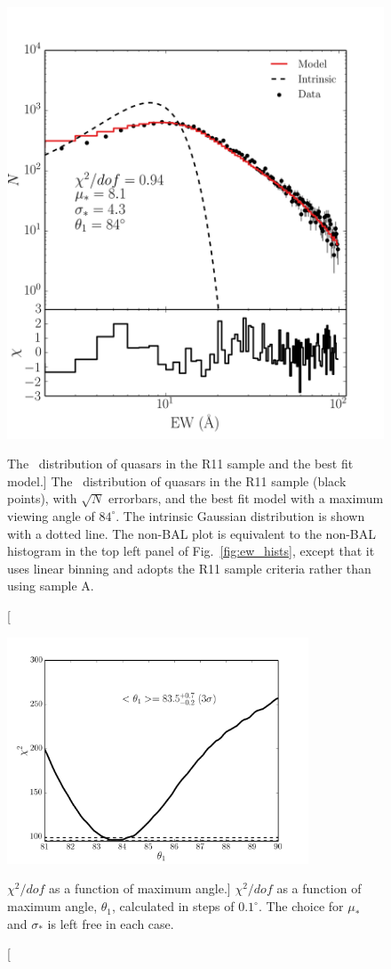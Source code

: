 \begin{figure}
\centering
\includegraphics[width=1.0\textwidth]{figures/ewpaper/log_quasar_fit.png}
\caption
[The \ewo\ distribution of quasars in the R11 sample and the best fit model.]
{
The \ewo\ distribution of quasars in the R11 sample (black points), 
with $\sqrt{N}$ errorbars, and the best fit model with a maximum 
viewing angle of $84^\circ$. The intrinsic Gaussian distribution
is shown with a dotted line. The non-BAL plot is equivalent to the non-BAL histogram 
in the top left panel of Fig.~\ref{fig:ew_hists}, except that it uses linear binning
and adopts the R11 sample criteria rather than using sample A.
}
\label{fig:chi2}
\end{figure}

\begin{figure}
\centering
\includegraphics[width=0.8\textwidth]{figures/ewpaper/chi2_o3.png}
\caption
[$\chi^2/dof$ as a function of maximum angle.]
{
$\chi^2/dof$ as a function of maximum angle, $\theta_1$, calculated in
steps of $0.1^\circ$. The choice for $\mu_*$ and $\sigma_*$ is 
left free in each case.
}
\label{fig:chi2_curve}
\end{figure}

